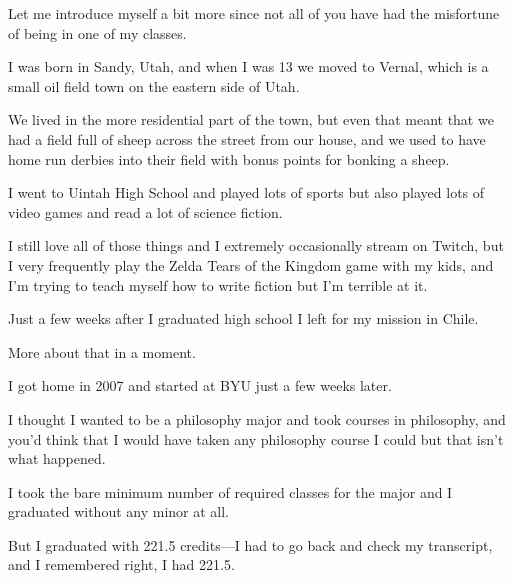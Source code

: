 \begin{compactitem}
			\item Let me introduce myself a bit more since not all of you have had the misfortune of being in one of my classes.
				\begin{compactitem}
					\item I was born in Sandy, Utah, and when I was 13 we moved to Vernal, which is a small oil field town on the eastern side of Utah.
					\item We lived in the more residential part of the town, but even that meant that we had a field full of sheep across the street from our house, and we used to have home run derbies into their field with bonus points for bonking a sheep.
					\item I went to Uintah High School and played lots of sports but also played lots of video games and read a lot of science fiction.
					\item I still love all of those things and I extremely occasionally stream on Twitch, but I very frequently play the Zelda Tears of the Kingdom game with my kids, and I'm trying to teach myself how to write fiction but I'm terrible at it.
					\item Just a few weeks after I graduated high school I left for my mission in Chile.
					\item More about that in a moment.
					\item I got home in 2007 and started at BYU just a few weeks later.
					\item I thought I wanted to be a philosophy major and took courses in philosophy, and you'd think that I would have taken any philosophy course I could but that isn't what happened.
					\item I took the bare minimum number of required classes for the major and I graduated without any minor at all.
					\item But I graduated with 221.5 credits---I had to go back and check my transcript, and I remembered right, I had 221.5.

\end{compactitem}
\end{compactitem}
